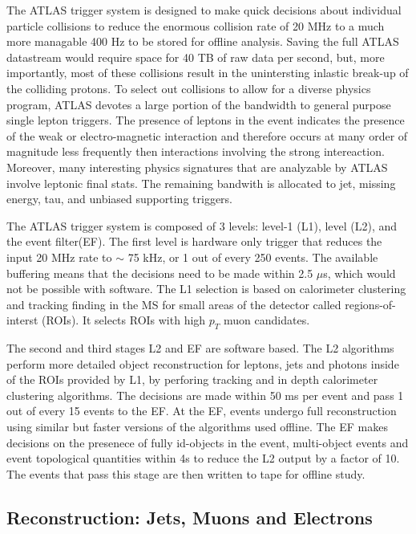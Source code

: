 The ATLAS trigger system is designed to make quick decisions about individual particle collisions to reduce the enormous collision rate of 20 MHz to a much more managable 400 Hz to be stored for offline analysis. Saving the full ATLAS datastream would require space for 40 TB of raw data per second, but, more importantly, most of these collisions result in the unintersting inlastic break-up of the colliding protons. To select out collisions to allow for a diverse physics program, ATLAS devotes a large portion of the bandwidth to general purpose single lepton triggers. The presence of leptons in the event indicates the presence of the weak or electro-magnetic interaction and therefore occurs at many order of magnitude less frequently then interactions involving the strong intereaction. Moreover, many interesting physics signatures that are analyzable by ATLAS involve leptonic final stats. The remaining bandwith is allocated to jet, missing energy, tau, and unbiased supporting triggers.

The ATLAS trigger system is composed of 3 levels: level-1 (L1), level (L2), and the event filter(EF). The first level is hardware only trigger that reduces the input 20 MHz rate to $\sim$ 75 kHz, or 1 out of every 250 events. The available buffering means that the decisions need to be made within 2.5 $\mu$s, which would not be possible with software. The L1 selection is based on calorimeter clustering and tracking finding in the MS for small areas of the detector called regions-of-interst (ROIs). It selects ROIs with high $p_T$ muon candidates.

The second and third stages L2 and EF are software based. The L2 algorithms perform more detailed object reconstruction for leptons, jets and photons inside of the ROIs provided by L1, by perforing tracking and in depth calorimeter clustering algorithms. The decisions are made within 50 ms per event and pass 1 out of every 15 events to the EF. At the EF, events undergo full reconstruction using similar but faster versions of the algorithms used offline. The EF makes decisions on the presenece of fully id-objects in the event, multi-object events and event topological quantities within 4s to reduce the L2 output by a factor of 10. The events that pass this stage are then written to tape for offline study.



\subsection{Reconstruction: Jets, Muons and Electrons}

